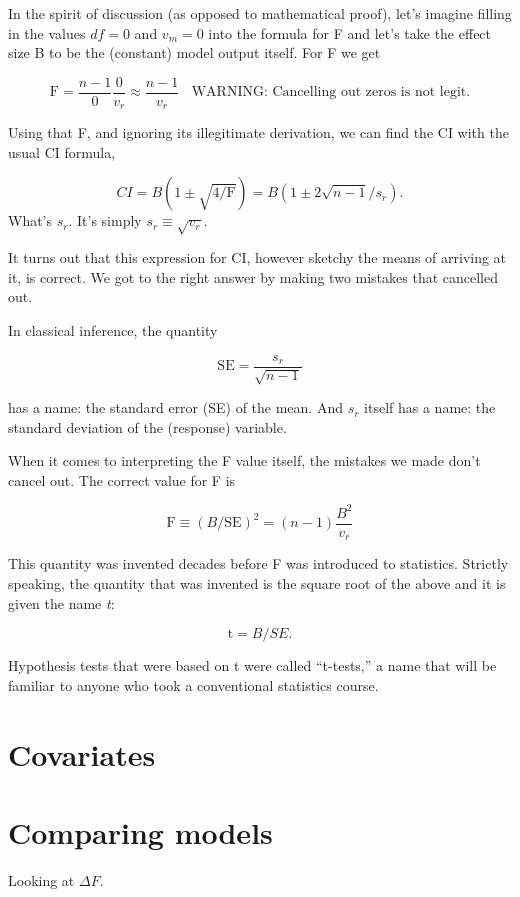 \documentclass[]{book}
\begin{document}
In the spirit of discussion (as opposed to mathematical proof), let's imagine filling in the values \(df=0\) and \(v_m=0\) into the formula for F and let's take the effect size B to be the (constant) model output itself. For F we get

\[\mbox{F}  = \frac{n - 1}{0} \frac{0}{v_r} \approx \frac{n-1}{v_r}\ \ \ \ \mbox{WARNING: Cancelling out zeros is not legit.}\]

Using that F, and ignoring its illegitimate derivation, we can find the CI with the usual CI formula,

\[CI = B (1 \pm \sqrt{4/\mbox{F}}) = B (1 \pm 2 \sqrt{n-1} / s_r).\]
What's \(s_r\). It's simply \(s_r \equiv \sqrt{v_r}\).

It turns out that this expression for CI, however sketchy the means of arriving at it, is correct. We got to the right answer by making two mistakes that cancelled out.

In classical inference, the quantity

\[\mbox{SE} = \frac{s_r}{\sqrt{n-1}}\]

has a name: the standard error (SE) of the mean. And \(s_r\) itself has a name: the standard deviation of the (response) variable.

When it comes to interpreting the F value itself, the mistakes we made don't cancel out. The correct value for F is

\[\mbox{F} \equiv (B / \mbox{SE})^2 = (n-1) \frac{B^2}{v_r}\]

This quantity was invented decades before F was introduced to statistics. Strictly speaking, the quantity that was invented is the square root of the above and it is given the name \emph{t}:

\[\mbox{t}  = B / SE.\]

Hypothesis tests that were based on t were called ``t-tests,'' a name that will be familiar to anyone who took a conventional statistics course.

\hypertarget{covariates}{%
\chapter{Covariates}\label{covariates}}

\hypertarget{comparing-models}{%
\chapter{Comparing models}\label{comparing-models}}

Looking at \(\Delta F\).
\end{document}
